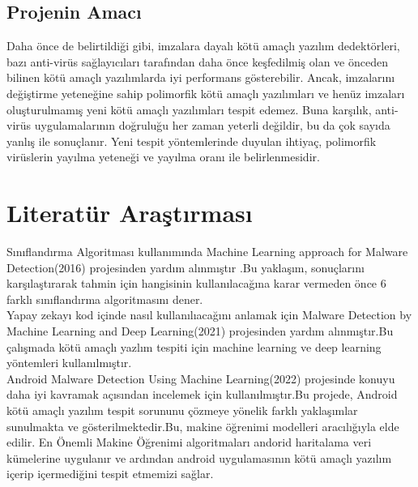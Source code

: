 \documentclass[12pt, a4paper]{article}
\begin{document}
\subsection{Projenin Amacı}
Daha önce de belirtildiği gibi, imzalara dayalı kötü amaçlı yazılım dedektörleri, bazı anti-virüs sağlayıcıları tarafından daha önce keşfedilmiş olan ve önceden bilinen kötü amaçlı yazılımlarda iyi performans gösterebilir. Ancak, imzalarını değiştirme yeteneğine sahip polimorfik kötü amaçlı yazılımları ve henüz imzaları oluşturulmamış yeni kötü amaçlı yazılımları tespit edemez. Buna karşılık, anti-virüs uygulamalarının doğruluğu her zaman yeterli değildir, bu da çok sayıda yanlış  ile sonuçlanır\cite{bas}. Yeni tespit yöntemlerinde duyulan ihtiyaç, polimorfik virüslerin yayılma yeteneği ve yayılma oranı ile belirlenmesidir.

\section{Literatür Araştırması}
Sınıflandırma Algoritması kullanımında Machine Learning approach for Malware Detection(2016) projesinden yardım alınmıştır .\cite{git1}Bu yaklaşım, sonuçlarını karşılaştırarak tahmin için hangisinin kullanılacağına karar vermeden önce 6 farklı sınıflandırma algoritmasını dener.
\\
Yapay zekayı kod içinde nasıl kullanılıacağını anlamak için Malware Detection by Machine Learning and Deep Learning(2021) projesinden yardım  alınmıştır.\cite{ytp1}Bu çalışmada kötü amaçlı yazlım tespiti için machine learning ve deep learning yöntemleri kullanılmıştır.
 \\
 Android Malware Detection Using Machine Learning(2022) projesinde konuyu daha iyi kavramak açısından incelemek için kullanılmıştır.\cite{git2}Bu projede, Android kötü amaçlı yazılım tespit sorununu çözmeye yönelik farklı yaklaşımlar sunulmakta ve gösterilmektedir.Bu, makine öğrenimi modelleri aracılığıyla elde edilir. En Önemli Makine Öğrenimi algoritmaları andorid haritalama veri kümelerine uygulanır ve ardından android uygulamasının kötü amaçlı yazılım içerip içermediğini tespit etmemizi sağlar.
 
\end{document}
